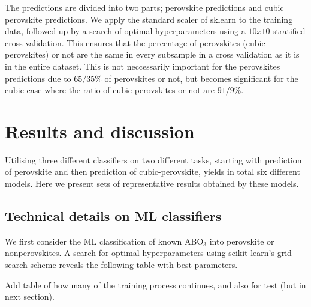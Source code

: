 

The predictions are divided into two parts; perovskite predictions and cubic perovskite predictions. We apply the standard scaler of sklearn \cite{Pedregosa2012} to the training data, followed up by a search of optimal hyperparameters using a $10x10$-stratified cross-validation. This ensures that the percentage of perovskites (cubic perovskites) or not are the same in every subsample in a cross validation as it is in the entire dataset. This is not neccessarily important for the perovskites predictions due to $65/35 \%$ of perovskites or not, but becomes significant for the cubic case where the ratio of cubic perovskites or not are $91/9\%$.

\section{Results and discussion}

Utilising three different classifiers on two different tasks, starting with prediction of perovskite and then prediction of cubic-perovskite, yields in total six different models. Here we present sets of representative results obtained by these models.

\subsection{Technical details on ML classifiers}

We first consider the ML classification of known ABO$_3$ into perovskite or nonperovskites. A search for optimal hyperparameters using scikit-learn's grid search scheme \cite{Pedregosa2012} reveals the following table with best parameters.

Add table of how many of the training process continues, and also for test (but in next section).

